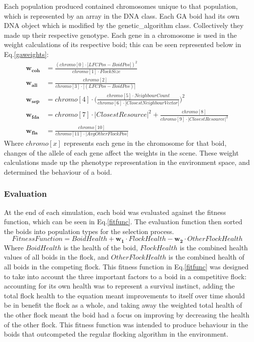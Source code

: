 Each population produced contained chromosomes unique to that population, which is represented by an array in the DNA class. Each GA boid had its own DNA object which is modified by the genetic\_algorithm class. Collectively they made up their respective genotype. Each gene in a chromosome is used in the weight calculations of its respective boid; this can be seen represented below in Eq.\ref{gaweights}:
\begin{equation}
\begin{split}
\boldsymbol{w_{coh}} &= \frac{(chromo[0] \cdot |LFCPos - BoidPos|)^2} {chromo[1] \cdot FlockSize} \\
\boldsymbol{w_{ali}} &= \frac{chromo[2]} {chromo[3] \cdot |(LFCPos - BoidPos)|} \\
\boldsymbol{w_{sep}} &= chromo[4] \cdot \Big(\frac{chromo[5] \cdot NeighbourCount} {chromo[6] \cdot |ClosestNeighbourVector|}\Big)^2 \\
\boldsymbol{w_{fda}} &= chromo[7] \cdot |ClosestResource|^2 + \frac{chromo[8]} {chromo[9] \cdot |ClosestResource|^2} \\
\boldsymbol{w_{fla}} &= \frac{chromo[10]} {chromo[11] \cdot |AvgOtherFlockPos|} 
\end{split}
\label{gaweights}
\end{equation}
Where $chromo[x]$ represents each gene in the chromosome for that boid, changes of the allele of each gene affect the weights in the scene.
These weight calculations made up the phenotype representation in the environment space, and determined the behaviour of a boid. 


\subsubsection{Evaluation}
At the end of each simulation, each boid was evaluated against the fitness function, which can be seen in Eq.\ref{fitfunc}. The evaluation function then sorted the boids into population types for the selection process. 
\begin{equation}
Fitness Function = BoidHealth + \boldsymbol{w_{1}} \cdot FlockHealth - \boldsymbol{w_{2}} \cdot OtherFlockHealth
\label{fitfunc}
\end{equation}
Where $BoidHealth$ is the health of the boid, $FlockHealth$ is the combined health values of all boids in the flock, and $OtherFlockHealth$ is the combined health of all boids in the competing flock.
This fitness function in Eq.\ref{fitfunc} was designed to take into account the three important factors to a boid in a competitive flock: accounting for its own health was to represent a survival instinct, adding the total flock health to the equation meant improvements to itself over time should be in benefit the flock as a whole, and taking away the weighted total health of the other flock meant the boid had a focus on improving by decreasing the health of the other flock. This fitness function was intended to produce behaviour in the boids that outcompeted the regular flocking algorithm in the environment.

